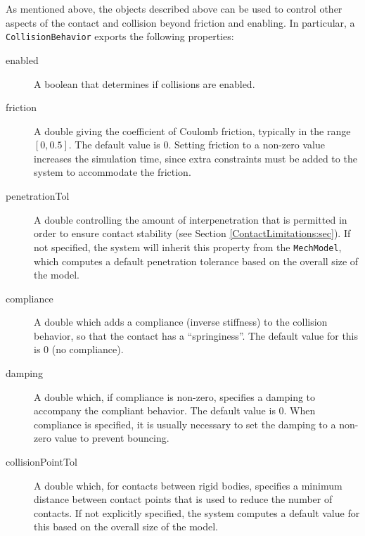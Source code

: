 As mentioned above, the
 objects
described above can be used to control other aspects of the contact
and collision beyond friction and enabling. In particular, a {\tt
CollisionBehavior} exports the following properties:

\begin{description}

\item[enabled]\mbox{}

A boolean that determines if collisions are enabled.

\item[friction]\mbox{}

A double giving the coefficient of Coulomb friction, typically in the
range $[0,0.5]$. The default value is 0. Setting friction to a
non-zero value increases the simulation time, since extra constraints
must be added to the system to accommodate the friction. 

\item[penetrationTol]\mbox{}

A double controlling the amount of interpenetration that is permitted
in order to ensure contact stability (see Section
\ref{ContactLimitations:sec}). If not specified, the system will
inherit this property from the {\tt MechModel}, which computes a
default penetration tolerance based on the overall size of the model.

\item[compliance]\mbox{}

A double which adds a compliance (inverse stiffness) to the collision
behavior, so that the contact has a ``springiness''. The default
value for this is 0 (no compliance).

\item[damping]\mbox{}

A double which, if {\sf compliance} is non-zero, specifies a damping
to accompany the compliant behavior. The default value is 0.  When
compliance is specified, it is usually necessary to set the damping to
a non-zero value to prevent bouncing.

\item[collisionPointTol]\mbox{}

A double which, for contacts between rigid bodies, specifies a minimum
distance between contact points that is used to reduce the number of
contacts. If not explicitly specified, the system computes a
default value for this based on the overall size of the model.


\end{description}
